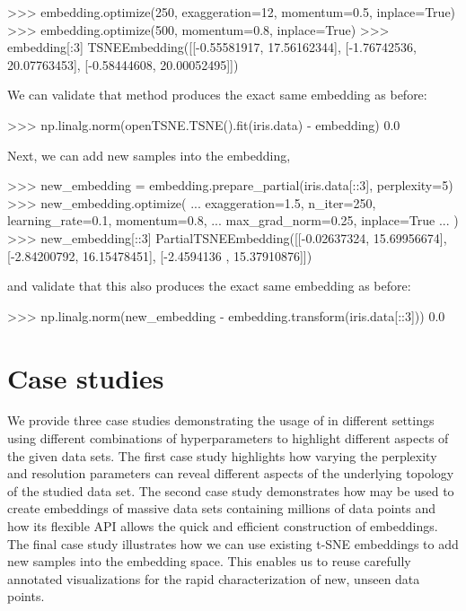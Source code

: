 \documentclass[article]{jss}
\newcommand{\opentsne}{\pkg{openTSNE}\xspace}
\begin{document}
\begin{CodeChunk}
\begin{CodeInput}
>>> embedding.optimize(250, exaggeration=12, momentum=0.5, inplace=True)
>>> embedding.optimize(500, momentum=0.8, inplace=True)
>>> embedding[:3]
TSNEEmbedding([[-0.55581917, 17.56162344],
               [-1.76742536, 20.07763453],
               [-0.58444608, 20.00052495]])
\end{CodeInput}
\end{CodeChunk}
We can validate that method produces the exact same embedding as before:
\begin{CodeChunk}
\begin{CodeInput}
>>> np.linalg.norm(openTSNE.TSNE().fit(iris.data) - embedding)
0.0
\end{CodeInput}
\end{CodeChunk}
Next, we can add new samples into the embedding,
\begin{CodeChunk}
\begin{CodeInput}
>>> new_embedding = embedding.prepare_partial(iris.data[::3], perplexity=5)
>>> new_embedding.optimize(
...     exaggeration=1.5, n_iter=250, learning_rate=0.1, momentum=0.8,
...     max_grad_norm=0.25, inplace=True
... )
>>> new_embedding[::3]
PartialTSNEEmbedding([[-0.02637324, 15.69956674],
                      [-2.84200792, 16.15478451],
                      [-2.4594136 , 15.37910876]])
\end{CodeInput}
\end{CodeChunk}
and validate that this also produces the exact same embedding as before:
\begin{CodeChunk}
\begin{CodeInput}
>>> np.linalg.norm(new_embedding - embedding.transform(iris.data[::3]))
0.0
\end{CodeInput}
\end{CodeChunk}

\section{Case studies} \label{sec:discussion}

We provide three case studies demonstrating the usage of \opentsne in different settings using different combinations of hyperparameters to highlight different aspects of the given data sets.
The first case study highlights how varying the perplexity and resolution parameters can reveal different aspects of the underlying topology of the studied data set.
The second case study demonstrates how \opentsne may be used to create embeddings of massive data sets containing millions of data points and how its flexible API allows the quick and efficient construction of embeddings.
The final case study illustrates how we can use existing t-SNE embeddings to add new samples into the embedding space. This enables us to reuse carefully annotated visualizations for the rapid characterization of new, unseen data points.
\end{document}
